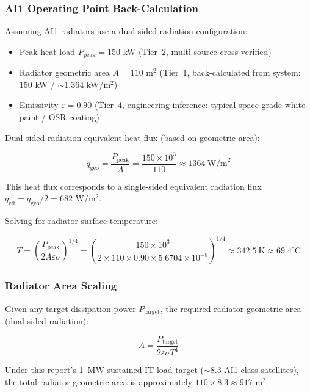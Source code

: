 \subsubsection{AI1 Operating Point Back-Calculation}

Assuming AI1 radiators use a dual-sided radiation configuration:
\begin{itemize}
  \item Peak heat load $P_{\text{peak}} = 150$ kW (Tier~2, multi-source cross-verified)
  \item Radiator geometric area $A = 110$ m$^2$ (Tier~1, back-calculated from system: $150$ kW / $\sim$1.364 kW/m$^2$)
  \item Emissivity $\varepsilon = 0.90$ (Tier~4, engineering inference: typical space-grade white paint / OSR coating)
\end{itemize}

Dual-sided radiation equivalent heat flux (based on geometric area):

\begin{equation}
  q_{\text{geo}} = \frac{P_{\text{peak}}}{A} = \frac{150 \times 10^{3}}{110} \approx 1364\ \text{W/m}^{2}
\end{equation}

This heat flux corresponds to a single-sided equivalent radiation flux $q_{\text{eff}} = q_{\text{geo}}/2 = 682$ W/m$^2$.

Solving for radiator surface temperature:

\begin{equation}
  T = \left(\frac{P_{\text{peak}}}{2A\varepsilon\sigma}\right)^{1/4}
    = \left(\frac{150 \times 10^{3}}{2 \times 110 \times 0.90 \times 5.6704 \times 10^{-8}}\right)^{1/4}
    \approx 342.5\ \text{K} \approx 69.4^{\circ}\text{C}
  \label{eq:ai1-temperature}
\end{equation}

\subsubsection{Radiator Area Scaling}

Given any target dissipation power $P_{\text{target}}$, the required radiator geometric area (dual-sided radiation):

\begin{equation}
  A = \frac{P_{\text{target}}}{2\varepsilon\sigma T^{4}}
  \label{eq:area-scaling}
\end{equation}

Under this report's 1~MW sustained IT load target ($\sim$8.3 AI1-class satellites), the total radiator geometric area is approximately $110 \times 8.3 \approx 917$ m$^2$.

